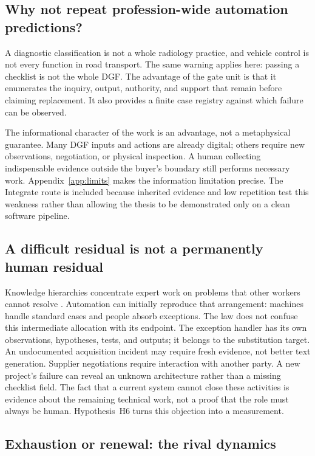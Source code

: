 \subsection{Why not repeat profession-wide automation predictions?}

A diagnostic classification is not a whole radiology practice, and vehicle control is not every
function in road transport. The same warning applies here: passing a checklist is not the whole DGF.
The advantage of the gate unit is that it enumerates the inquiry, output, authority, and support that
remain before claiming replacement. It also provides a finite case registry against which failure can
be observed.

The informational character of the work is an advantage, not a metaphysical guarantee. Many DGF inputs
and actions are already digital; others require new observations, negotiation, or physical inspection.
A human collecting indispensable evidence outside the buyer's boundary still performs necessary work.
Appendix~\ref{app:limits} makes the information limitation precise. The Integrate route is included because inherited evidence and low repetition test this weakness rather than allowing the thesis to be demonstrated only
on a clean software pipeline.

\subsection{A difficult residual is not a permanently human residual}

Knowledge hierarchies concentrate expert work on problems that other workers cannot resolve
\citep[Sections~1 and~3]{garicano2015}. Automation can initially reproduce that arrangement: machines
handle standard cases and people absorb exceptions. The law does not confuse this intermediate
allocation with its endpoint. The exception handler has its own observations, hypotheses, tests, and
outputs; it belongs to the substitution target. An undocumented acquisition incident may require fresh
evidence, not better text generation. Supplier negotiations require interaction with another party. A
new project's failure can reveal an unknown architecture rather than a missing checklist field. The
fact that a current system cannot close these activities is evidence about the remaining technical
work, not a proof that the role must always be human. Hypothesis~H6 turns this objection into a
measurement.

\subsection{Exhaustion or renewal: the rival dynamics}
\label{sec:renewal}

